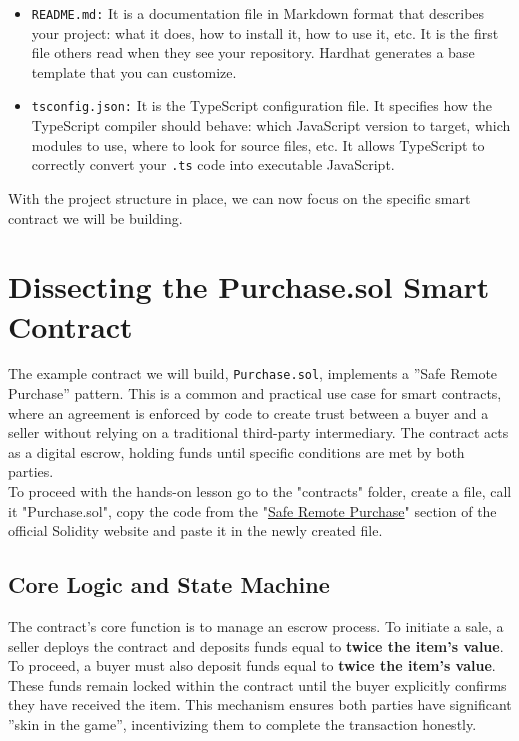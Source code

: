 \documentclass{scrbook}
\begin{document}
\begin{itemize}
    \item
    \texttt{README.md:} It is a documentation file in Markdown format that describes your project: what it does, how to install it, how to use it, etc. It is the first file others read when they see your repository. Hardhat generates a base template that you can customize.

    \item
    \texttt{tsconfig.json:} It is the TypeScript configuration file. It specifies how the TypeScript compiler should behave: which JavaScript version to target, which modules to use, where to look for source files, etc. It allows TypeScript to correctly convert your \texttt{.ts} code into executable JavaScript.
\end{itemize}

With the project structure in place, we can now focus on the specific smart contract we will be building.

\chapter{Dissecting the Purchase.sol Smart Contract}

The example contract we will build, \texttt{Purchase.sol}, implements a ''Safe Remote Purchase'' pattern. This is a common and practical use case for smart contracts, where an agreement is enforced by code to create trust between a buyer and a seller without relying on a traditional third-party intermediary. The contract acts as a digital escrow, holding funds until specific conditions are met by both parties. \\

To proceed with the hands-on lesson go to the "contracts" folder, create a file, call it "Purchase.sol", copy the code from the "\href{https://docs.soliditylang.org/en/latest/solidity-by-example.html#safe-remote-purchase}{Safe Remote Purchase}" section of the official Solidity website and paste it in the newly created file.

\section{Core Logic and State Machine}

The contract's core function is to manage an escrow process. To initiate a sale, a seller deploys the contract and deposits funds equal to \textbf{twice the item's value}. To proceed, a buyer must also deposit funds equal to \textbf{twice the item's value}. These funds remain locked within the contract until the buyer explicitly confirms they have received the item. This mechanism ensures both parties have significant ''skin in the game'', incentivizing them to complete the transaction honestly.\\
\end{document}
